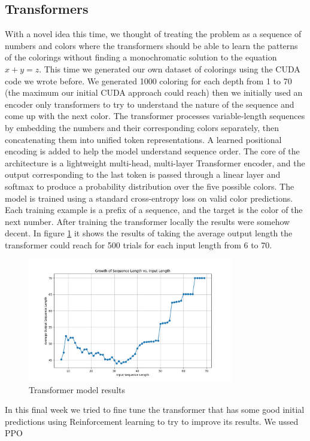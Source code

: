\documentclass[12pt]{article}
\begin{document}
\subsection{Transformers}
With a novel idea this time, we thought of treating the problem as a sequence of numbers and colors where the transformers should be able to learn the patterns of the colorings without finding a monochromatic solution to the equation $x + y = z$. This time we generated our own dataset of colorings using the CUDA code we wrote before.
We generated 1000 coloring for each depth from 1 to 70 (the maximum our initial CUDA approach could reach) then we initially used an encoder only transformers to try to understand the nature of the sequence and come up with the next color. The transformer processes variable-length sequences by embedding the numbers and their corresponding colors separately, then concatenating them into unified token representations. A learned positional encoding is added to help the model understand sequence order. The core of the architecture is a lightweight multi-head, multi-layer Transformer encoder, and the output corresponding to the last token is passed through a linear layer and softmax to produce a probability distribution over the five possible colors. The model is trained using a standard cross-entropy loss on valid color predictions.
Each training example is a prefix of a sequence, and the target is the color of the next
number. After training the transformer locally the results were somehow decent. In figure \ref{fig:transformer} it shows the results of taking the average output length the transformer could reach for 500 trials for each input length from 6 to 70.
\begin{figure}[h]
    \centering
    \includegraphics[width=0.8\textwidth]{images/TransformerOnly.png}
    \caption{Transformer model results}
    \label{fig:transformer}
\end{figure} 
In this final week we tried to fine tune the transformer that has some good initial predictions using Reinforcement learning to try to improve its results. We ussed PPO
\end{document}
